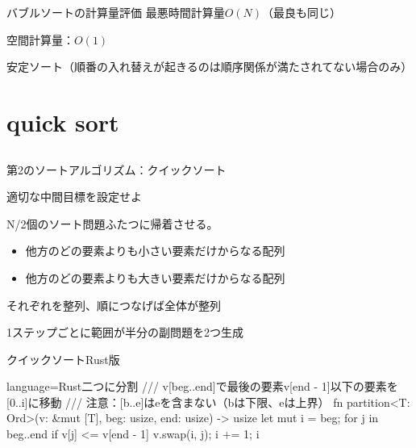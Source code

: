 \documentclass{beamer}
\begin{document}
\begin{frame}[fragile]{バブルソートの計算量評価}{}
最悪時間計算量$O(N)$（最良も同じ）

\vfill
空間計算量：$O(1)$

\vfill
安定ソート（順番の入れ替えが起きるのは順序関係が満たされてない場合のみ）
\end{frame}

\section{quick sort}		%
\subsection{}

\begin{frame}[fragile]{第2のソートアルゴリズム：クイックソート}{}

\vfill
適切な中間目標を設定せよ

\vfill
N/2個のソート問題ふたつに帰着させる。

\begin{itemize}%
\item 他方のどの要素よりも小さい要素だけからなる配列
\item 他方のどの要素よりも大きい要素だけからなる配列
\end{itemize}
それぞれを整列、順につなげば全体が整列

\vfill
1ステップごとに範囲が半分の副問題を2つ生成
\end{frame}

\begin{frame}[fragile]{クイックソートRust版}{}
\begin{codeof}{language=Rust}{二つに分割}
/// v[beg..end]で最後の要素v[end - 1]以下の要素を[0..i]に移動
/// 注意：[b..e]はeを含まない（bは下限、eは上界）
fn partition<T: Ord>(v: &mut [T], beg: usize, end: usize) -> usize {
    let mut i = beg;
    for j in beg..end {
        if v[j] <= v[end - 1] {
            v.swap(i, j);
            i += 1;
        }
    }
    i
}
\end{codeof}
\end{frame}
\end{document}
